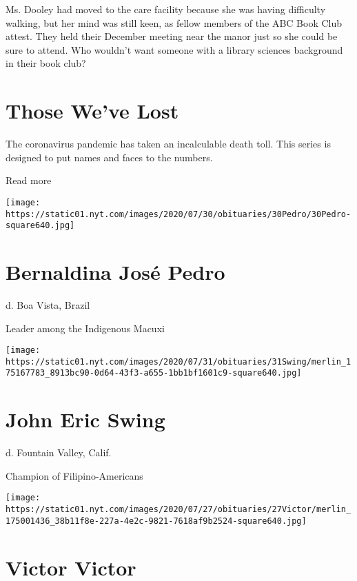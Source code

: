 Ms. Dooley had moved to the care facility because she was having
difficulty walking, but her mind was still keen, as fellow members of
the ABC Book Club attest. They held their December meeting near the
manor just so she could be sure to attend. Who wouldn't want someone
with a library sciences background in their book club?

\href{https://www.nytimes.com/interactive/2020/obituaries/people-died-coronavirus-obituaries.html?action=click\&pgtype=Article\&state=default\&region=BELOW_MAIN_CONTENT\&context=covid_obits_promo}{}

\hypertarget{those-weve-lost}{%
\section{Those We've Lost}\label{those-weve-lost}}

The coronavirus pandemic has taken an incalculable death toll. This
series is designed to put names and faces to the numbers.

Read more

\texttt{[image: https://static01.nyt.com/images/2020/07/30/obituaries/30Pedro/30Pedro-square640.jpg]}

\hypertarget{bernaldina-josuxe9-pedro}{%
\section{Bernaldina José Pedro}\label{bernaldina-josuxe9-pedro}}

d. Boa Vista, Brazil

Leader among the Indigenous Macuxi

\texttt{[image: https://static01.nyt.com/images/2020/07/31/obituaries/31Swing/merlin\_175167783\_8913bc90-0d64-43f3-a655-1bb1bf1601c9-square640.jpg]}

\hypertarget{john-eric-swing}{%
\section{John Eric Swing}\label{john-eric-swing}}

d. Fountain Valley, Calif.

Champion of Filipino-Americans

\texttt{[image: https://static01.nyt.com/images/2020/07/27/obituaries/27Victor/merlin\_175001436\_38b11f8e-227a-4e2c-9821-7618af9b2524-square640.jpg]}

\hypertarget{victor-victor}{%
\section{Victor Victor}\label{victor-victor}}

